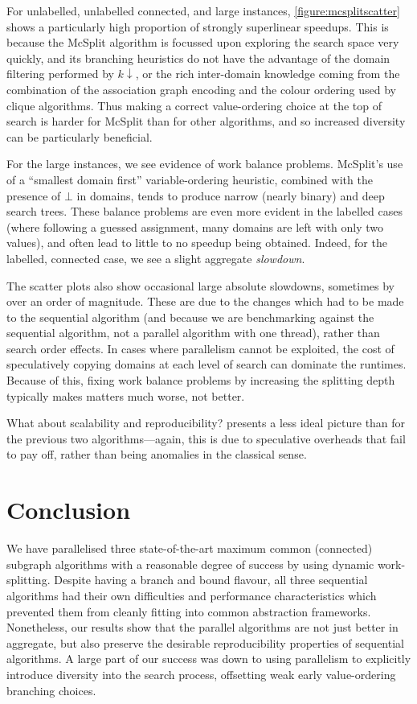 \documentclass{llncs}
\begin{document}
For unlabelled, unlabelled connected, and large instances, \cref{figure:mcsplitscatter} shows a
particularly high proportion of strongly superlinear speedups. This is because the McSplit algorithm
is focussed upon exploring the search space very quickly, and its branching heuristics do not have
the advantage of the domain filtering performed by $k{\downarrow}$, or the rich inter-domain
knowledge coming from the combination of the association graph encoding and the colour ordering used
by clique algorithms.  Thus making a correct value-ordering choice at the top of search is harder
for McSplit than for other algorithms, and so increased diversity can be particularly beneficial.

For the large instances, we see evidence of work balance problems. McSplit's use of a ``smallest
domain first'' variable-ordering heuristic, combined with the presence of $\bot$ in domains, tends
to produce narrow (nearly binary) and deep search trees. These balance problems are even more
evident in the labelled cases (where following a guessed assignment, many domains are left with only
two values), and often lead to little to no speedup being obtained. Indeed, for the labelled,
connected case, we see a slight aggregate \emph{slowdown}.

The scatter plots also show occasional large absolute slowdowns, sometimes by over an order of
magnitude.  These are due to the changes which had to be made to the sequential algorithm (and
because we are benchmarking against the sequential algorithm, not a parallel algorithm with one
thread), rather than search order effects. In cases where parallelism cannot be exploited, the cost
of speculatively copying domains at each level of search can dominate the runtimes. Because of this,
fixing work balance problems by increasing the splitting depth typically makes matters much worse,
not better.

What about scalability and reproducibility?  presents a
less ideal picture than for the previous two algorithms---again, this is due to speculative
overheads that fail to pay off, rather than being anomalies in the classical sense.

\section{Conclusion}

We have parallelised three state-of-the-art maximum common (connected) subgraph algorithms with a
reasonable degree of success by using dynamic work-splitting. Despite having a branch and bound
flavour, all three sequential algorithms had their own difficulties and performance characteristics
which prevented them from cleanly fitting into common abstraction frameworks. Nonetheless, our
results show that the parallel algorithms are not just better in aggregate, but also preserve the
desirable reproducibility properties of sequential algorithms. A large part of our success was down
to using parallelism to explicitly introduce diversity into the search process, offsetting weak
early value-ordering branching choices.
\end{document}
